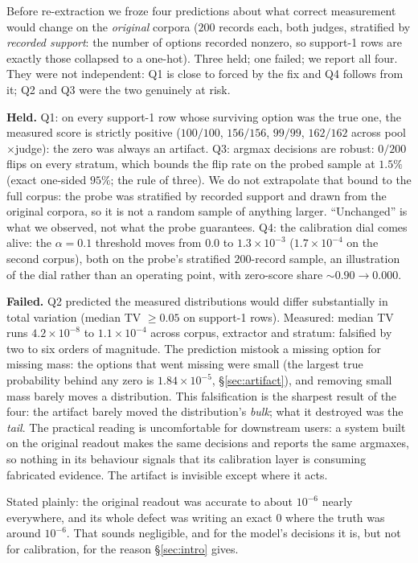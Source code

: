 \documentclass{article}
\newif\ifclaimtags\claimtagsfalse
\newcommand{\ct}[1]{\ifclaimtags\hfill{\scriptsize\textcolor{gray}{[#1]}}\fi}
\begin{document}
Before re-extraction we froze four predictions about what correct measurement
would change on the \emph{original} corpora ($200$ records each, both judges,
stratified by \emph{recorded support}: the number of options recorded nonzero,
so support-1 rows are exactly those collapsed to a one-hot).\ct{C18} Three held;
one failed; we report all four. They were not independent: Q1 is close to forced
by the fix and Q4 follows from it; Q2 and Q3 were the two genuinely at
risk.

\textbf{Held.} Q1: on every support-1 row whose surviving option was the true
one, the measured score is strictly positive ($100/100$, $156/156$, $99/99$,
$162/162$ across pool$\times$judge): the zero was always an artifact. Q3: argmax decisions are robust: $0/200$ flips on every stratum, which bounds the flip rate on the
probed sample at $1.5\%$ (exact one-sided $95\%$; the rule of three). We do not
extrapolate that bound to the full corpus: the probe was stratified by recorded
support and drawn from the original corpora, so it is not a random sample of
anything larger. ``Unchanged'' is what we observed, not what the probe
guarantees.\ct{C51} Q4: the calibration dial comes alive: the $\alpha{=}0.1$ threshold moves from $0.0$ to $1.3\times10^{-3}$
($1.7\times10^{-4}$ on the second corpus), both on the probe's stratified
$200$-record sample, an illustration of the dial rather than an operating point, with zero-score share ${\sim}0.90 \to 0.000$.\ct{C13, C15--C16}

\textbf{Failed.} Q2 predicted the measured distributions would differ
substantially in total variation (median TV $\ge 0.05$ on support-1 rows).
Measured: median TV runs $4.2\times10^{-8}$ to $1.1\times10^{-4}$ across
corpus, extractor and stratum: falsified by two to six orders of magnitude.\ct{C14}
The prediction mistook a missing option for missing mass: the options that went
missing were small (the largest true probability behind any zero is
$1.84\times10^{-5}$, \S\ref{sec:artifact}), and removing small mass barely moves
a distribution.
This falsification is the sharpest result of the four: the artifact barely moved the distribution's \emph{bulk}; what it destroyed
was the \emph{tail}. The practical
reading is uncomfortable for downstream users: a system built on the original readout makes the same decisions and reports
the same argmaxes, so nothing in its behaviour signals that its calibration layer
is consuming fabricated evidence. The artifact is invisible except where it acts.

Stated plainly: the original readout was accurate to about $10^{-6}$ nearly
everywhere, and its whole defect was writing an exact $0$ where the truth was
around $10^{-6}$. That sounds negligible, and for the model's decisions it is, but not for calibration, for the reason \S\ref{sec:intro} gives.\ct{C17}
\end{document}
